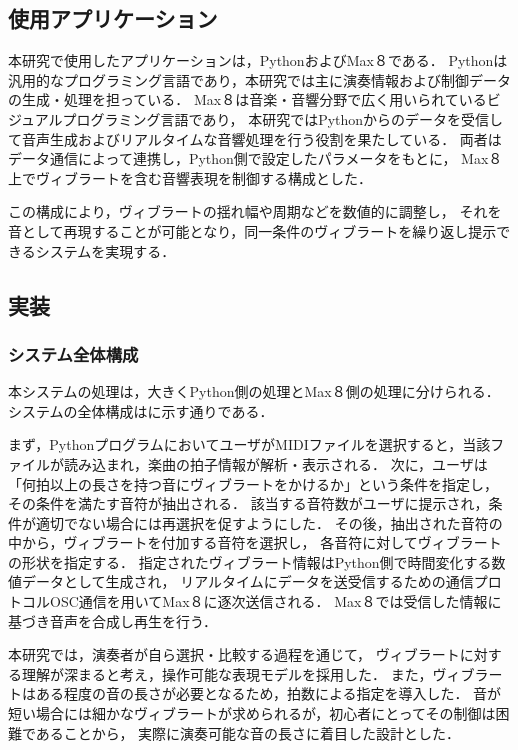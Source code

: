 \subsection{使用アプリケーション}

本研究で使用したアプリケーションは，PythonおよびMax８である．
Pythonは汎用的なプログラミング言語であり，本研究では主に演奏情報および制御データの生成・処理を担っている．
Max８は音楽・音響分野で広く用いられているビジュアルプログラミング言語であり，
本研究ではPythonからのデータを受信して音声生成およびリアルタイムな音響処理を行う役割を果たしている．
両者はデータ通信によって連携し，Python側で設定したパラメータをもとに，
Max８上でヴィブラートを含む音響表現を制御する構成とした．

この構成により，ヴィブラートの揺れ幅や周期などを数値的に調整し，
それを音として再現することが可能となり，同一条件のヴィブラートを繰り返し提示できるシステムを実現する．


\subsection{実装}

\subsubsection{システム全体構成}

本システムの処理は，大きくPython側の処理とMax８側の処理に分けられる．
システムの全体構成はに示す通りである．

まず，PythonプログラムにおいてユーザがMIDIファイルを選択すると，当該ファイルが読み込まれ，楽曲の拍子情報が解析・表示される．
次に，ユーザは「何拍以上の長さを持つ音にヴィブラートをかけるか」という条件を指定し，
その条件を満たす音符が抽出される．
該当する音符数がユーザに提示され，条件が適切でない場合には再選択を促すようにした．
その後，抽出された音符の中から，ヴィブラートを付加する音符を選択し，
各音符に対してヴィブラートの形状を指定する．
指定されたヴィブラート情報はPython側で時間変化する数値データとして生成され，
リアルタイムにデータを送受信するための通信プロトコルOSC通信を用いてMax８に逐次送信される．
Max８では受信した情報に基づき音声を合成し再生を行う．

本研究では，演奏者が自ら選択・比較する過程を通じて，
ヴィブラートに対する理解が深まると考え，操作可能な表現モデルを採用した．
また，ヴィブラートはある程度の音の長さが必要となるため，拍数による指定を導入した．
音が短い場合には細かなヴィブラートが求められるが，初心者にとってその制御は困難であることから，
実際に演奏可能な音の長さに着目した設計とした．

